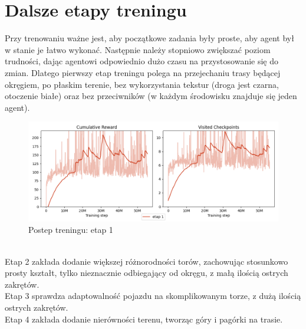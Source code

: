 \section{Dalsze etapy treningu}
Przy trenowaniu ważne jest, aby początkowe zadania były proste, aby agent był w stanie je łatwo wykonać. Następnie należy stopniowo zwiększać poziom trudności, dając agentowi odpowiednio dużo czasu na przystosowanie się do zmian. Dlatego pierwszy etap treningu polega na przejechaniu trasy będącej okręgiem, po płaskim terenie, bez wykorzystania tekstur (droga jest czarna, otoczenie białe) oraz bez przeciwników (w każdym środowisku znajduje się jeden agent).
\begin{figure}[H]
    \centering
    \includegraphics[width=\textwidth]{graphs/training_progress_1.png}
    \caption{Postep treningu: etap 1}
    \label{fig}
\end{figure}
\phantom{.}\\
Etap 2 zakłada dodanie większej różnorodności torów, zachowując stosunkowo prosty kształt, tylko nieznacznie odbiegający od okręgu, z małą ilością ostrych zakrętów.\\
Etap 3 sprawdza adaptowalność pojazdu na skomplikowanym torze, z dużą ilością ostrych zakrętów.\\
Etap 4 zakłada dodanie nierówności terenu, tworząc góry i pagórki na trasie.\\
